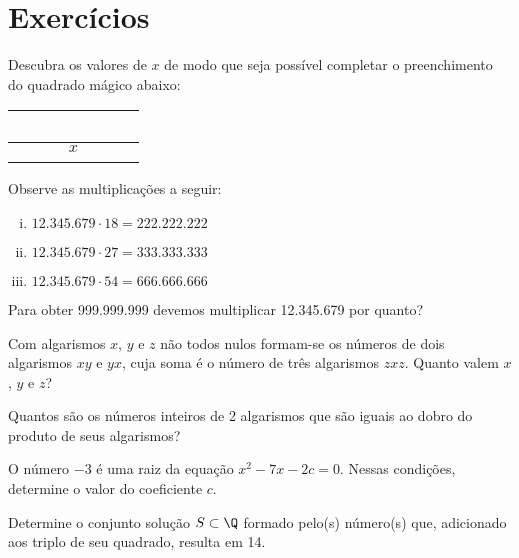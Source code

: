\section{Exercícios}

\begin{exercise}
Descubra os valores de $x$ de modo que seja possível completar
o preenchimento do quadrado mágico abaixo:
\begin{center}
\begin{tabular}{|c|c|c|}
  \hline
   \ \ \  & \ \ \  & \ \ \  \\ \hline
          & $x$    &        \\ \hline
          &        &        \\
  \hline
\end{tabular}
\end{center}
\end{exercise}

\begin{exercise}
Observe as multiplicações a seguir:
\begin{enumerate}[i.]
  \item $12.345.679 \cdot 18 = 222.222.222$
  \item $12.345.679 \cdot 27 = 333.333.333$
  \item $12.345.679 \cdot 54 = 666.666.666$
\end{enumerate}
Para obter 999.999.999 devemos multiplicar 12.345.679 por quanto?
\end{exercise}

\begin{exercise}
Com algarismos $x$, $y$ e $z$ não todos nulos formam-se os
números de dois algarismos $xy$ e $yx$, cuja soma é o número de três
algarismos $zxz$. Quanto valem $x$, $y$ e $z$?
\end{exercise}

\begin{exercise}
Quantos são os números inteiros de 2 algarismos que são iguais
ao dobro do produto de seus algarismos?
\end{exercise}


\begin{exercise}
O número $-3$ é uma raiz da equação $x^2 -7x -2c = 0$. Nessas
condições, determine o valor do coeficiente $c$.
\end{exercise}

\begin{exercise}
	Determine o conjunto solução $S \subset \Q$ formado pelo(s) número(s) que, adicionado aos triplo de seu quadrado, resulta em 14.
\end{exercise}

